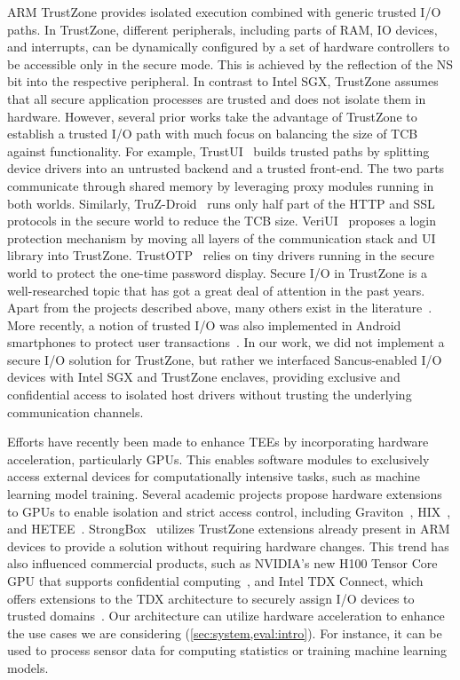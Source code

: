 ARM TrustZone provides isolated execution combined with generic trusted I/O
paths. In TrustZone, different peripherals, including parts of RAM, IO devices,
and interrupts, can be dynamically configured by a set of hardware controllers
to be accessible only in the secure mode. This is achieved by the reflection of
the NS bit into the respective peripheral. In contrast to Intel \ac{SGX},
TrustZone assumes that all secure application processes are trusted and does not
isolate them in hardware. However, several prior works take the advantage of
TrustZone to establish a trusted I/O path with much focus on balancing the size
of TCB against functionality. For example, TrustUI~\cite{TrustUI} builds trusted
paths by splitting device drivers into an untrusted backend and a trusted
front-end. The two parts communicate through shared memory by leveraging proxy
modules running in both worlds. Similarly, TruZ-Droid~\cite{Truz-droid} runs
only half part of the HTTP and SSL protocols in the secure world to reduce the
TCB size. VeriUI~\cite{veriUI} proposes a login protection mechanism by moving
all layers of the communication stack and UI library into TrustZone.
TrustOTP~\cite{TrustOTP} relies on tiny drivers running in the secure world to
protect the one-time password display. Secure I/O in TrustZone is a
well-researched topic that has got a great deal of attention in the past years.
Apart from the projects described above, many others exist in the
literature~\cite{TrustPay,TruzView,Adattester,Vbutton}. More recently, a notion
of trusted I/O was also implemented in Android smartphones to protect user
transactions~\cite{ProtectedConfirmation}. In our work, we did not implement a
secure I/O solution for TrustZone, but rather we interfaced Sancus-enabled I/O
devices with Intel \ac{SGX} and TrustZone enclaves, providing exclusive and
confidential access to isolated host drivers without trusting the underlying
communication channels.

Efforts have recently been made to enhance \acp{TEE} by incorporating hardware
acceleration, particularly GPUs. This enables software modules to exclusively
access external devices for computationally intensive tasks, such as machine
learning model training. Several academic projects propose hardware extensions
to GPUs to enable isolation and strict access control, including
Graviton~\cite{volos2018graviton}, HIX~\cite{jang2019heterogeneous}, and
HETEE~\cite{zhu2020enabling}. StrongBox~\cite{deng2022strongbox} utilizes
TrustZone extensions already present in ARM devices to provide a solution
without requiring hardware changes. This trend has also influenced commercial
products, such as NVIDIA's new H100 Tensor Core GPU that supports confidential
computing~\cite{nvidiaCC}, and Intel TDX Connect, which offers extensions to the
TDX architecture to securely assign I/O devices to trusted
domains~\cite{intelTdxConnect}. Our architecture can utilize hardware
acceleration to enhance the use cases we are considering
(\cref{sec:system,eval:intro}). For instance, it can be used to process sensor
data for computing statistics or training machine learning models.